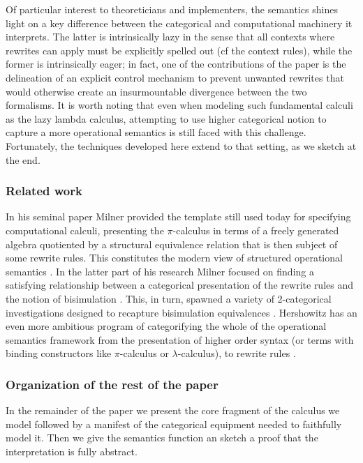 \documentclass[]{acm_proc_article-sp}
\numberwithin{equation}{subsection}
\newcommand{\pic}{$\pi$-calculus}
\begin{document}
Of particular interest to theoreticians and implementers, the
semantics shines light on a key difference between the categorical and
computational machinery it interprets. The latter is intrinsically
lazy in the sense that all contexts where rewrites can apply must be
explicitly spelled out (cf the context rules), while the former is
intrinsically eager; in fact, one of the contributions of the paper is
the delineation of an explicit control mechanism to prevent unwanted
rewrites that would otherwise create an insurmountable divergence
between the two formalisms. It is worth noting that even when modeling
such fundamental calculi as the lazy lambda calculus, attempting to
use higher categorical notion to capture a more operational semantics
is still faced with this challenge. Fortunately, the techniques
developed here extend to that setting, as we sketch at the end.

\subsubsection{Related work}


In his seminal paper \cite{DBLP:journals/mscs/Milner92} Milner
provided the template still used today for specifying computational
calculi, presenting the {\pic} in terms of a freely generated algebra
quotiented by a structural equivalence relation that is then subject
of some rewrite rules. This constitutes the modern view of structured
operational semantics \cite{Plotkin04theorigins}. In the latter part
of his research Milner focused on finding a satisfying relationship
between a categorical presentation of the rewrite rules and the notion
of bisimulation \cite{DBLP:conf/concur/LeiferM00}. This, in turn,
spawned a variety of 2-categorical investigations designed to
recapture bisimulation equivalences
\cite{Sassone02derivingbisimulation}. Hershowitz has an even more
ambitious program of categorifying the whole of the operational
semantics framework from the presentation of higher order syntax (or
terms with binding constructors like {\pic} or $\lambda$-calculus), to
rewrite rules \cite{hirschowitzcc2c}. 

\subsubsection{Organization of the rest of the paper}

In the remainder of the paper we present the core fragment of the
calculus we model followed by a manifest of the categorical equipment
needed to faithfully model it. Then we give the semantics function an
sketch a proof that the interpretation is fully abstract.
\end{document}
